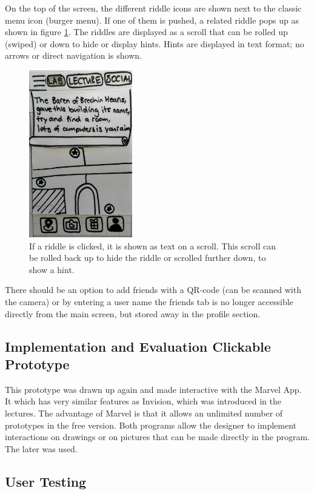 \documentclass[10pt,twocolumn]{article} %
\begin{document}
On the top of the screen, the different riddle icons are shown next to the classic menu icon (burger menu). If one of them is pushed, a related riddle pops up as shown in figure \ref{fig:map_riddle}. The riddles are displayed as a scroll that can be rolled up (swiped) or down to hide or display hints. Hints are displayed in text format; no arrows or direct navigation is shown.

\begin{figure}[ht]
\centering
\includegraphics[width=0.4\textwidth]{./figures/map_riddle.jpg}
\caption{If a riddle is clicked, it is shown as text on a scroll. This scroll can be rolled back up to hide the riddle or scrolled further down, to show a hint.}
\label{fig:map_riddle}
\end{figure}

There should be an option to add friends with a QR-code (can be scanned with the camera) or by entering a user name the friends tab is no longer accessible directly from the main screen, but stored away in the profile section. 

\subsection*{Implementation and Evaluation Clickable Prototype}
This prototype was drawn up again and made interactive with the Marvel App. It which has very similar features as Invision, which was introduced in the lectures. The advantage of Marvel is that it allows an unlimited number of prototypes in the free version. Both programs allow the designer to implement interactions on drawings or on pictures that can be made directly in the program. The later was used.


\subsection*{User Testing}
\end{document}
